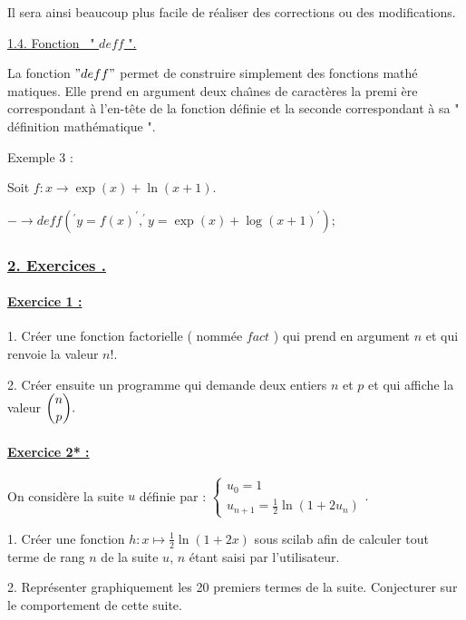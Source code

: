 \documentclass{article}
\begin{document}
Il sera ainsi beaucoup plus facile de r\'{e}aliser des corrections ou des
modifications.

\underline{1.4. Fonction \ " $deff$ ".}

La fonction $"deff"$ permet de construire simplement des fonctions math\'{e}%
matiques. Elle prend en argument deux cha\^{\i}nes de caract\`{e}res la premi%
\`{e}re correspondant \`{a} l'en-t\^{e}te de la fonction d\'{e}finie et la
seconde correspondant \`{a} sa " d\'{e}finition math\'{e}matique ".

Exemple 3 :

Soit $f:x\rightarrow \exp (x)+\ln (x+1).$

$-\rightarrow deff(^{\prime }y=f(x)^{\prime },^{\prime }y=\exp (x)+\log
(x+1)^{\prime });$

\bigskip

\subsubsection{\protect\underline{2. Exercices .}}

\bigskip

\paragraph{\protect\underline{Exercice 1 :}}

1. Cr\'{e}er une fonction factorielle ( nomm\'{e}e $fact$ ) qui prend en
argument $n$ et qui renvoie la valeur $n!.$

2. Cr\'{e}er ensuite un programme qui demande deux entiers $n$ et $p$ et qui
affiche la valeur $\dbinom{n}{p}.$

\bigskip

\paragraph{\protect\underline{Exercice 2* :}}

On consid\`{e}re la suite $u$ d\'{e}finie par : $\left\{ 
\begin{array}{c}
u_{0}=1 \\ 
u_{n+1}=\frac{1}{2}\ln (1+2u_{n})%
\end{array}%
\right. .$

1. Cr\'{e}er une fonction $h:x\mapsto \frac{1}{2}\ln (1+2x)$ sous scilab
afin de calculer tout terme de rang $n$ de la suite $u$, $n$ \'{e}tant saisi
par l'utilisateur.

2. Repr\'{e}senter graphiquement les 20 premiers termes de la suite.
Conjecturer sur le comportement de cette suite.
\end{document}
